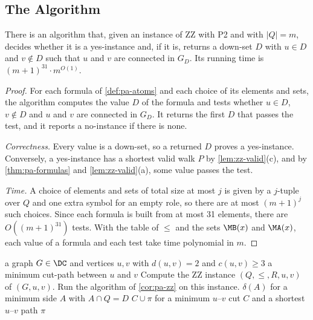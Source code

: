 \subsection{The Algorithm}
\label{sec:pa-algorithm}

\begin{corollary}
\label{cor:pa-zz}
There is an algorithm that, given an instance of ZZ with P2 and with $|Q| = m$, decides whether it is a yes-instance and, if it is, returns a down-set $D$ with $u \in D$ and $v \notin D$ such that $u$ and $v$ are connected in $G_D$.
Its running time is $(m + 1)^{31} \cdot m^{O(1)}$.
\end{corollary}

\begin{proof}
For each formula of \cref{def:pa-atoms} and each choice of its elements and sets, the algorithm computes the value $D$ of the formula and tests whether $u \in D$, $v \notin D$ and $u$ and $v$ are connected in $G_D$.
It returns the first $D$ that passes the test, and it reports a no-instance if there is none.

\emph{Correctness.}
Every value is a down-set, so a returned $D$ proves a yes-instance.
Conversely, a yes-instance has a shortest valid walk $P$ by \cref{lem:zz-valid}(c), and by \cref{thm:pa-formulas} and \cref{lem:zz-valid}(a), some value passes the test.

\emph{Time.}
A choice of elements and sets of total size at most $j$ is given by a $j$-tuple over $Q$ and one extra symbol for an empty role, so there are at most $(m + 1)^j$ such choices.
Since each formula is built from at most 31 elements, there are $O((m + 1)^{31})$ tests.
With the table of $\leq$ and the sets $\MB(x)$ and $\MA(x)$, each value of a formula and each test take time polynomial in $m$.
\end{proof}

\begin{algorithm}[tb]
\caption{A minimum cut-path for an instance $(G, u, v)$ of the open case}
\label{alg:pa-open-case}
\begin{algorithmic}[1]
\Require a graph $G \in \DC$ and vertices $u, v$ with $d(u, v) = 2$ and $c(u, v) \geq 3$
\Ensure a minimum cut-path between $u$ and $v$
\State Compute the ZZ instance $(Q, \leq, R, u, v)$ of $(G, u, v)$.
\State Run the algorithm of \cref{cor:pa-zz} on this instance.
\State \Return $\delta(A)$ for a minimum side $A$ with $A \cap Q = D$
\Else
\State \Return $C \cup \pi$ for a minimum $u$--$v$ cut $C$ and a shortest $u$--$v$ path $\pi$
\EndIf
\end{algorithmic}
\end{algorithm}

